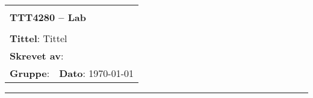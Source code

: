 \documentclass[a4paper,11pt,norsk]{article}
\begin{document}
\setcounter{page}{0}

\begin{minipage}[c]{0.15\textwidth}
\end{minipage}
\begin{minipage}[c]{0.85\textwidth}

\renewcommand{\arraystretch}{1.7}
\large 
\begin{tabularx}{\textwidth}{|X|X|}
\hline
\multicolumn{2}{|l|}{} \\
\multicolumn{2}{|l|}{\huge \textbf{TTT4280 -- Lab}} \\
\multicolumn{2}{|l|}{}  \\
\hline
\multicolumn{2}{|l|}{\textbf{Tittel}: 
Tittel
} \\
\hline
\multicolumn{2}{|l|}{\textbf{Skrevet av}:
} \\
\hline
\textbf{Gruppe}:  & \textbf{Dato}: \today
\\
\hline 
\end{tabularx}
\end{minipage}
\normalsize

\newpage


\pagestyle{fancy}
\fancyhf{}
\renewcommand{\footrulewidth}{0.5pt}

\clearpage

\setlength{\parskip}{1ex}
\renewcommand{\baselinestretch}{0.1}\normalsize
\tableofcontents
\renewcommand{\baselinestretch}{1.00}\normalsize
\setlength{\parskip}{2ex}
\rule{\textwidth}{0.5pt}


\newpage



{}

\begingroup
\makeatletter
\makeatother
{}


\endgroup

\nocite{*} %
\clearpage
\appendix

\end{document}
